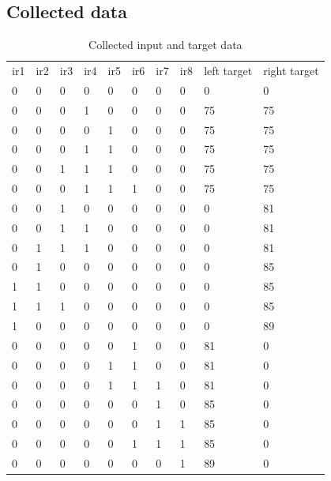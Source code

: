 \documentclass[14pt,a4paper]{extarticle}
\begin{document}
	\subsection{Collected data}
	
	\begin{table}[H]
\centering
\caption{Collected input and target data}
\label{my-label}
\begin{tabular}{llllllllll}
ir1 & ir2 & ir3 & ir4 & ir5 & ir6 & ir7 & ir8 & left target & right target \\
0   & 0   & 0   & 0   & 0   & 0   & 0   & 0   & 0           & 0            \\
0   & 0   & 0   & 1   & 0   & 0   & 0   & 0   & 75          & 75           \\
0   & 0   & 0   & 0   & 1   & 0   & 0   & 0   & 75          & 75           \\
0   & 0   & 0   & 1   & 1   & 0   & 0   & 0   & 75          & 75           \\
0   & 0   & 1   & 1   & 1   & 0   & 0   & 0   & 75          & 75           \\
0   & 0   & 0   & 1   & 1   & 1   & 0   & 0   & 75          & 75           \\
0   & 0   & 1   & 0   & 0   & 0   & 0   & 0   & 0           & 81           \\
0   & 0   & 1   & 1   & 0   & 0   & 0   & 0   & 0           & 81           \\
0   & 1   & 1   & 1   & 0   & 0   & 0   & 0   & 0           & 81           \\
0   & 1   & 0   & 0   & 0   & 0   & 0   & 0   & 0           & 85           \\
1   & 1   & 0   & 0   & 0   & 0   & 0   & 0   & 0           & 85           \\
1   & 1   & 1   & 0   & 0   & 0   & 0   & 0   & 0           & 85           \\
1   & 0   & 0   & 0   & 0   & 0   & 0   & 0   & 0           & 89           \\
0   & 0   & 0   & 0   & 0   & 1   & 0   & 0   & 81          & 0            \\
0   & 0   & 0   & 0   & 1   & 1   & 0   & 0   & 81          & 0            \\
0   & 0   & 0   & 0   & 1   & 1   & 1   & 0   & 81          & 0            \\
0   & 0   & 0   & 0   & 0   & 0   & 1   & 0   & 85          & 0            \\
0   & 0   & 0   & 0   & 0   & 0   & 1   & 1   & 85          & 0            \\
0   & 0   & 0   & 0   & 0   & 1   & 1   & 1   & 85          & 0            \\
0   & 0   & 0   & 0   & 0   & 0   & 0   & 1   & 89          & 0           
\end{tabular}
\end{table}
	
\end{document}
